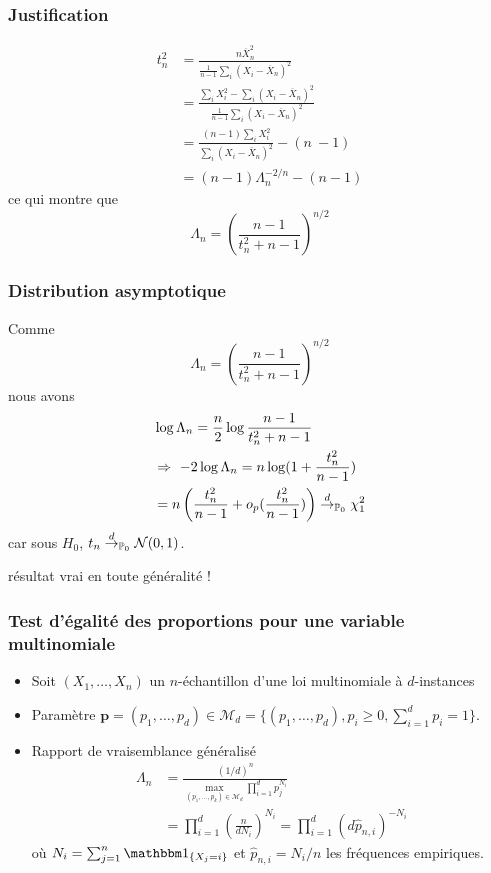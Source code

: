 \begin{frame}
\frametitle{Justification}
\begin{align*}
t_{n}^{2} &=\frac{n\overline{X}_{n}^{2}}{\frac{1}{n-1}\sum_{i}(X_{i}-\overline{X}_{n})^{2}} \\
&=\frac{\sum_{i}X_{i}^{2}-\sum_{i}(X_{i}-\overline{X}_{n})^{2}}{\frac{1}{n-1}\sum_{i}(X_{i}-\overline{X}_{n})^{2}} \\
&=\frac{(n-1)\sum_{i}X_{i}^{2}}{\sum_{i}(X_{i}-\overline{X}_{n})^{2}}-(n\ -1) \\
&=(n-1)\Lambda_{n}^{-2/n}-(n-1)
\end{align*}
ce qui montre que
$$
\Lambda_{n}=(\frac{n-1}{t_{n}^{2}+n-1})^{n/2}
$$
\end{frame}

\begin{frame}
\frametitle{Distribution asymptotique}
Comme
$$
\Lambda_{n}=(\frac{n-1}{t_{n}^{2}+n-1})^{n/2}
$$
nous avons
\begin{align*}
&\log\Lambda_{n}=\frac{n}{2}\log\frac{n-1}{t_{n}^{2}+n-1} \\
&\Rightarrow \ -2\log\Lambda_{n}=n\log(1+\frac{t_{n}^{2}}{n-1}) \\
&=n \left(\frac{t_{n}^{2}}{n-1}+o_{p}(\frac{t_{n}^{2}}{n-1}) \right) \stackrel{d}{\rightarrow}_{\operatorname{{\mathbb P}}_0} \chi_{1}^{2}
\end{align*}
car sous $H_{0}$,  $t_{n} \stackrel{d}{\rightarrow}_{\operatorname{{\mathbb P}}_0} \mathcal{N}(0,1)$.

\bigskip

\alert{résultat vrai en toute généralité !}
\end{frame}


\begin{frame}
\frametitle{Test d'égalité des proportions pour une variable multinomiale}
\begin{itemize}
\item Soit $(X_1,\dots,X_n)$ un $n$-échantillon d'une loi multinomiale à $d$-instances
\item \alert{Paramètre} $\mathbf{p}= (p_1,\dots,p_d) \in \mathcal{M}_d= \{ (p_1, \dots, p_d), p_i \geq 0, \sum_{i=1}^d p_i =1 \}$.
\item \alert{Rapport de vraisemblance généralisé}
\alert{
\begin{align*}
\Lambda_n
&= \frac{(1/d)^n}{\max_{(p_1,\dots,p_k) \in \mathcal{M}_d} \prod_{i=1}^d p_j^{N_i} } \\
&= \prod_{i=1}^d \left( \frac{n}{d N_i} \right)^{N_i} = \prod_{i=1}^d (d \hat{p}_{n,i})^{-N_i}
\end{align*}
}
où $N_i= \sum_{j=1}^n \indi{X_j=i}$  et $\hat{p}_{n,i}= N_i/n$ les fréquences empiriques.
\end{itemize}
\end{frame}


